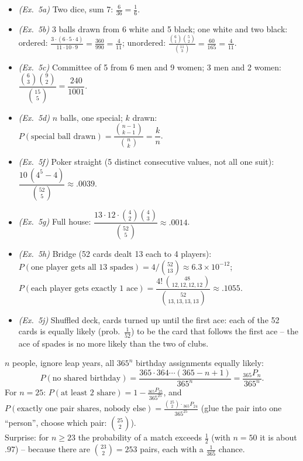 \documentclass[11pt]{article}
\newcommand{\nCr}[2]{\binom{#1}{#2}}
\newcommand{\nPr}[2]{{}_{#1}P_{#2}}
\newcommand{\multi}[2]{\binom{#1}{#2}}
\begin{document}
\begin{exbox}
\begin{itemize}
\item \emph{(Ex.\ 5a)} Two dice, sum 7: $\frac6{36}=\frac16$.
\item \emph{(Ex.\ 5b)} 3 balls drawn from 6 white and 5 black; one white and two black:
 ordered: $\frac{3\cdot(6\cdot5\cdot4)}{11\cdot10\cdot9}=\frac{360}{990}=\frac4{11}$; unordered: $\frac{\nCr61\nCr52}{\nCr{11}3}=\frac{60}{165}=\frac4{11}$.
\item \emph{(Ex.\ 5c)} Committee of 5 from 6 men and 9 women; 3 men and 2 women: $\dfrac{\nCr63\nCr92}{\nCr{15}5}=\dfrac{240}{1001}$.
\item \emph{(Ex.\ 5d)} $n$ balls, one special; $k$ drawn: $P(\text{special ball drawn})=\dfrac{\nCr{n-1}{k-1}}{\nCr nk}=\dfrac kn$.
\item \emph{(Ex.\ 5f)} Poker straight (5 distinct consecutive values, not all one suit): $\dfrac{10\,(4^5-4)}{\nCr{52}5}\approx.0039$.
\item \emph{(Ex.\ 5g)} Full house: $\dfrac{13\cdot12\cdot\nCr42\nCr43}{\nCr{52}5}\approx.0014$.
\item \emph{(Ex.\ 5h)} Bridge (52 cards dealt 13 each to 4 players): $P(\text{one player gets all 13 spades})=4/\nCr{52}{13}\approx6.3\times10^{-12}$; $P(\text{each player gets exactly 1 ace})=\dfrac{4!\,\multi{48}{12,12,12,12}}{\multi{52}{13,13,13,13}}\approx.1055$.
\item \emph{(Ex.\ 5j)} Shuffled deck, cards turned up until the first ace: each of the 52 cards is equally likely (prob.\ $\frac1{52}$) to be the card that follows the first ace -- the ace of spades is no more likely than the two of clubs.
\end{itemize}
\end{exbox}

\begin{exbox}
$n$ people, ignore leap years, all $365^n$ birthday assignments equally likely:
\[ P(\text{no shared birthday})=\frac{365\cdot364\cdots(365-n+1)}{365^{n}}=\frac{\nPr{365}{n}}{365^n}. \]
For $n=25$: $P(\text{at least 2 share})=1-\frac{\nPr{365}{25}}{365^{25}}$, and $P(\text{exactly one pair shares, nobody else})=\frac{\nCr{25}{2}\cdot\nPr{365}{24}}{365^{25}}$ (glue the pair into one ``person'', choose which pair: $\nCr{25}2$).\\
Surprise: for $n\ge23$ the probability of a match exceeds $\frac12$ (with $n=50$ it is about $.97$) -- because there are $\nCr{23}2=253$ pairs, each with a $\frac1{365}$ chance.
\end{exbox}
\end{document}
